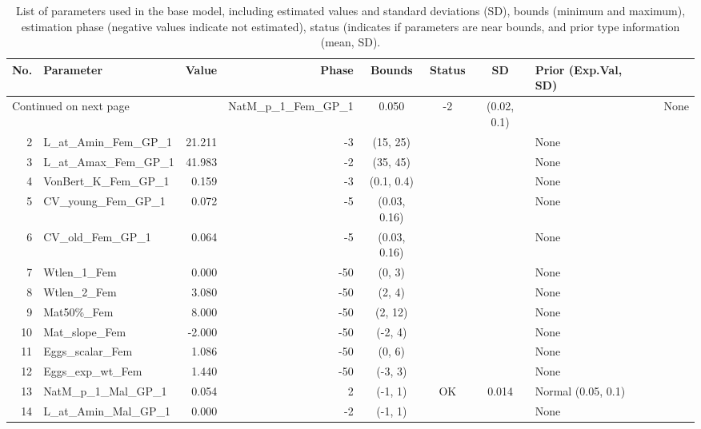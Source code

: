\documentclass[12pt,]{article}
\begin{document}
\FloatBarrier

\FloatBarrier

\begin{landscape}
\begin{longtable}{rlrrcccl}
\caption{List of parameters used in
                                              the base model, including estimated 
                                              values and standard deviations (SD), 
                                              bounds (minimum and maximum), 
                                              estimation phase (negative values indicate
                                              not estimated), status (indicates if 
                                              parameters are near bounds, and prior type
                                              information (mean, SD).} \\ 
  \hline
No. & Parameter & Value & Phase & Bounds & Status & SD & Prior (Exp.Val, SD)  \\ 
  \hline 
\endhead 
\hline 
\multicolumn{3}{l}{\footnotesize Continued on next page} 
\endfoot 
\endlastfoot 
 \hline
1 & NatM\_p\_1\_Fem\_GP\_1 & 0.050 & -2 & (0.02, 0.1) &  &  & None \\ 
  2 & L\_at\_Amin\_Fem\_GP\_1 & 21.211 & -3 & (15, 25) &  &  & None \\ 
  3 & L\_at\_Amax\_Fem\_GP\_1 & 41.983 & -2 & (35, 45) &  &  & None \\ 
  4 & VonBert\_K\_Fem\_GP\_1 & 0.159 & -3 & (0.1, 0.4) &  &  & None \\ 
  5 & CV\_young\_Fem\_GP\_1 & 0.072 & -5 & (0.03, 0.16) &  &  & None \\ 
  6 & CV\_old\_Fem\_GP\_1 & 0.064 & -5 & (0.03, 0.16) &  &  & None \\ 
  7 & Wtlen\_1\_Fem & 0.000 & -50 & (0, 3) &  &  & None \\ 
  8 & Wtlen\_2\_Fem & 3.080 & -50 & (2, 4) &  &  & None \\ 
  9 & Mat50\%\_Fem & 8.000 & -50 & (2, 12) &  &  & None \\ 
  10 & Mat\_slope\_Fem & -2.000 & -50 & (-2, 4) &  &  & None \\ 
  11 & Eggs\_scalar\_Fem & 1.086 & -50 & (0, 6) &  &  & None \\ 
  12 & Eggs\_exp\_wt\_Fem & 1.440 & -50 & (-3, 3) &  &  & None \\ 
  13 & NatM\_p\_1\_Mal\_GP\_1 & 0.054 & 2 & (-1, 1) & OK & 0.014 & Normal (0.05, 0.1) \\ 
  14 & L\_at\_Amin\_Mal\_GP\_1 & 0.000 & -2 & (-1, 1) &  &  & None \\ 

\end{longtable}
\end{landscape}
\end{document}
